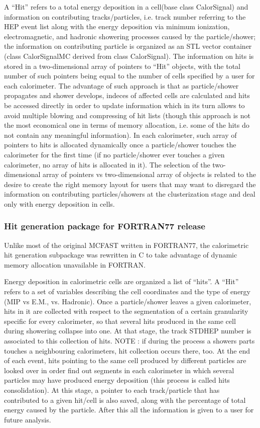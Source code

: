 A ``Hit'' refers to a total energy deposition in a cell(base class CalorSignal) 
and information on contributing tracks/particles, i.e. track number referring 
to the HEP event list along with the energy deposition via minimum ionization,
electromagnetic, and hadronic showering processes caused
by the particle/shower; the information on contributing particle is organized
as an STL vector container (class CalorSignalMC derived from class CalorSignal). 
The information on hits is stored in a two-dimensional array of pointers 
to ``Hit'' objects, with the total number of such pointers being equal to the number
of cells specified by a user for each calorimeter. 
The advantage of such approach is that as particle/shower propagates
and shower develops, indeces of affected cells are calculated and hits be accessed
directly in order to update information which in its turn allows to avoid multiple
blowing and compressing of hit lists (though this approach is not the most economical 
one in terms of memory allocation, i.e. some of the hits do not contain any meaningful
information). In each calorimeter, such array of pointers to hits is allocated dynamically 
once a particle/shower touches the calorimeter for the first time (if no particle/shower 
ever touches a given calorimeter, no array of hits is allocated in it).
The selection of the two-dimensional array of pointers vs two-dimensional array of objects
is related to the desire to create the right memory layout for users that may want 
to disregard the information on contributing particles/showers at the clusterization
stage and deal only with energy deposition in cells. 
 
\subsubsection{Hit generation package for FORTRAN77 release}

Unlike most of the original MCFAST written in FORTRAN77, the calorimetric hit generation
subpackage was rewritten in C to take advantage of dynamic memory allocation unavailable
in FORTRAN. 

Energy deposition in calorimetric cells are organized a list of ``hits''. 
A ``Hit'' refers to  a set of variables describing the cell coordinates 
and the type of energy (MIP vs E.M., vs. Hadronic). 
Once a particle/shower leaves a given calorimeter,  hits in it are collected
with respect to the segmentation of a certain granularity  specific for every
calorimeter, so that several hits produced in the same cell during showering
collapse into one. At that stage, the track STDHEP number is associated to
this collection of hits. NOTE : if during the process a showers parts touches 
a neighbouring calorimeters, hit collection occurs there, too. At the
end of each event, hits pointing  to the same cell  produced by different particles 
are looked over in
order find out segments in each calorimeter in which several particles may
have produced energy deposition (this process is called hits consolidation).
At this stage, a pointer to each track/particle that has contributed to a
given hit/cell  is also saved, along with the percentage of total energy
caused by the particle. After this all the information is given to a user for
future analysis.

